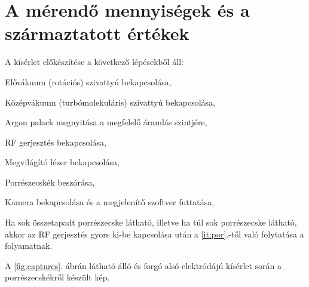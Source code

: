 \clearpage

	
\section{A mérendő mennyiségek és a származtatott értékek}
	A kísérlet előkészítése a következő lépésekből áll:
	\begin{enumerate*}
		\item Elővákuum {\color{red}(rotációs)} szivattyú bekapcsolása,
		\item Középvákuum {\color{red}(turbómolekuláris)} szivattyú bekapcsolása,
		\item Argon palack megnyitása a megfelelő áramlás szintjére,
		\item RF gerjesztés bekapcsolása,
		\item Megvilágító lézer bekapcsolása,
		\item \label{it:por} Porrészecskék beszórása,
		\item Kamera bekapcsolása és a megjelenítő szoftver futtatása,
		\item Ha sok összetapadt porrészecske látható, illetve ha túl sok porrészecske látható, akkor
		az RF gerjesztés gyors ki-be kapcsolása után a \ref{it:por}.-től való folytatása a folyamatnak.
	\end{enumerate*}
	A \ref{fig:captures}. ábrán látható álló és forgó alsó elektródájú kísérlet során a
	porrészecskékről készült kép.
	
